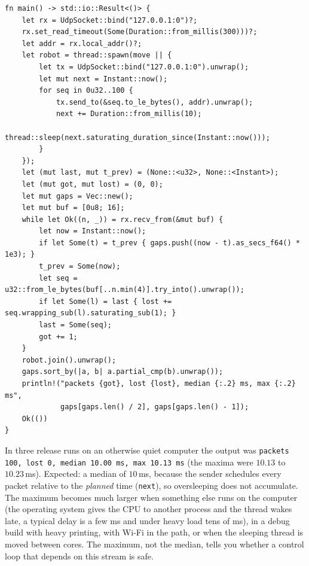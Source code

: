 \begin{enumerate}[label=\textbf{\ansnum.\arabic*}]
\begin{verbatim}
fn main() -> std::io::Result<()> {
    let rx = UdpSocket::bind("127.0.0.1:0")?;
    rx.set_read_timeout(Some(Duration::from_millis(300)))?;
    let addr = rx.local_addr()?;
    let robot = thread::spawn(move || {
        let tx = UdpSocket::bind("127.0.0.1:0").unwrap();
        let mut next = Instant::now();
        for seq in 0u32..100 {
            tx.send_to(&seq.to_le_bytes(), addr).unwrap();
            next += Duration::from_millis(10);
            thread::sleep(next.saturating_duration_since(Instant::now()));
        }
    });
    let (mut last, mut t_prev) = (None::<u32>, None::<Instant>);
    let (mut got, mut lost) = (0, 0);
    let mut gaps = Vec::new();
    let mut buf = [0u8; 16];
    while let Ok((n, _)) = rx.recv_from(&mut buf) {
        let now = Instant::now();
        if let Some(t) = t_prev { gaps.push((now - t).as_secs_f64() * 1e3); }
        t_prev = Some(now);
        let seq = u32::from_le_bytes(buf[..n.min(4)].try_into().unwrap());
        if let Some(l) = last { lost += seq.wrapping_sub(l).saturating_sub(1); }
        last = Some(seq);
        got += 1;
    }
    robot.join().unwrap();
    gaps.sort_by(|a, b| a.partial_cmp(b).unwrap());
    println!("packets {got}, lost {lost}, median {:.2} ms, max {:.2} ms",
             gaps[gaps.len() / 2], gaps[gaps.len() - 1]);
    Ok(())
}
\end{verbatim}
In three release runs on an otherwise quiet computer the output was \verb!packets 100, lost 0, median 10.00 ms, max 10.13 ms! (the maxima were $10.13$ to $10.23$\,ms). Expected: a median of $10$\,ms, because the sender schedules every packet relative to the \emph{planned} time (\verb!next!), so oversleeping does not accumulate. The maximum becomes much larger when something else runs on the computer (the operating system gives the CPU to another process and the thread wakes late, a typical delay is a few ms and under heavy load tens of ms), in a debug build with heavy printing, with Wi-Fi in the path, or when the sleeping thread is moved between cores. The maximum, not the median, tells you whether a control loop that depends on this stream is safe.
\end{enumerate}
